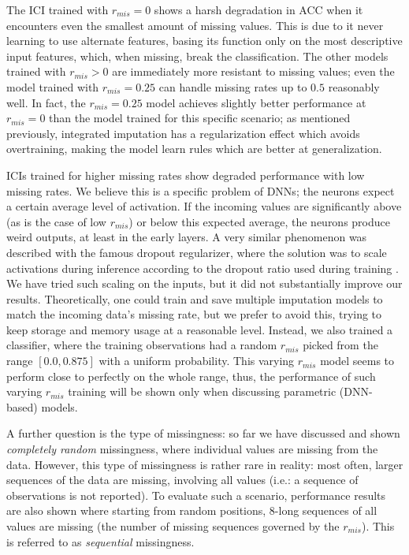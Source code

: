				The \ac{ICI} trained with $r_{mis} = 0$ shows a harsh degradation in \ac{ACC} when it encounters even the smallest amount of missing values.
				This is due to it never learning to use alternate features, basing its function only on the most descriptive input features, which, when missing, break the classification.
				The other models trained with $r_{mis} > 0$ are immediately more resistant to missing values; even the model trained with $r_{mis} =  0.25$ can handle missing rates up to $0.5$ reasonably well.
				In fact, the $r_{mis} =  0.25$ model achieves slightly better performance at $r_{mis} =  0$ than the model trained for this specific scenario; as mentioned previously, integrated imputation has a regularization effect which avoids overtraining, making the model learn rules which are better at generalization.	
				
				\acp{ICI} trained for higher missing rates show degraded performance with low missing rates.
				We believe this is a specific problem of \acp{DNN}; the neurons expect a certain average level of activation.
				If the incoming values are significantly above (as is the case of low $r_{mis}$) or below this expected average, the neurons produce weird outputs, at least in the early layers.
				A very similar phenomenon was described with the famous dropout regularizer, where the solution was to scale activations during inference according to the dropout ratio used during training \cite{dropout}.
				We have tried such scaling on the inputs, but it did not substantially improve our results.
				Theoretically, one could train and save multiple imputation models to match the incoming data's missing rate, but we prefer to avoid this, trying to keep storage and memory usage at a reasonable level.
				Instead, we also trained a classifier, where the training observations had a random $r_{mis}$ picked from the range $[0.0, 0.875]$ with a uniform probability.
				This varying $r_{mis}$ model seems to perform close to perfectly on the whole range, thus, the performance of such varying $r_{mis}$ training will be shown only when discussing parametric (\ac{DNN}-based) models.
				
				A further question is the type of missingness: so far we have discussed and shown \textit{completely random} missingness, where individual values are missing from the data.
				However, this type of missingness is rather rare in reality: most often, larger sequences of the data are missing, involving all values (i.e.: a sequence of observations is not reported).
				To evaluate such a scenario, performance results are also shown where starting from random positions, $8$-long sequences of all values are missing (the number of missing sequences governed by the $r_{mis}$).
				This is referred to as \textit{sequential} missingness.
		

